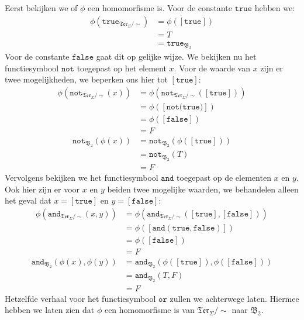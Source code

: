 \documentclass[a4paper,11pt]{article}
\begin{document}
\begin{enumerate}
Eerst bekijken we of $\phi$ een homomorfisme is. Voor de constante
$\texttt{true}$ hebben we:
\begin{align*}
\phi(\texttt{true}_{\mathfrak{Ter}_{\Sigma}/\sim}) &= \phi([\texttt{true}]) \\
                                                   &= T \\
                                                   &= \texttt{true}_{\mathfrak{B}_{2}}
\end{align*}
Voor de constante $\texttt{false}$ gaat dit op gelijke wijze. We bekijken nu
het functiesymbool $\texttt{not}$ toegepast op het element $x$. Voor de waarde
van $x$ zijn er twee mogelijkheden, we beperken ons hier tot
$[\texttt{true}]$:
\begin{align*}
\phi(\texttt{not}_{\mathfrak{Ter}_{\Sigma}/\sim}(x)) &= \phi(\texttt{not}_{\mathfrak{Ter}_{\Sigma}/\sim}([\texttt{true}])) \\
                                                     &= \phi([\texttt{not(true)}]) \\
                                                     &= \phi([\texttt{false}]) \\
                                                     &= F
\end{align*}
\begin{align*}
\texttt{not}_{\mathfrak{B}_{2}}(\phi(x)) &= \texttt{not}_{\mathfrak{B}_{2}}(\phi([\texttt{true}])) \\
                                         &= \texttt{not}_{\mathfrak{B}_{2}}(T) \\
                                         &= F
\end{align*}
Vervolgens bekijken we het functiesymbool $\texttt{and}$ toegepast op de
elementen $x$ en $y$. Ook hier zijn er voor $x$ en $y$ beiden twee mogelijke
waarden, we behandelen alleen het geval dat $x = [\texttt{true}]$ en $y =
[\texttt{false}]$:
\begin{align*}
\phi(\texttt{and}_{\mathfrak{Ter}_{\Sigma}/\sim}(x,y)) &= \phi(\texttt{and}_{\mathfrak{Ter}_{\Sigma}/\sim}([\texttt{true}],[\texttt{false}])) \\
                                                       &= \phi([\texttt{and}(\texttt{true},\texttt{false})]) \\
                                                       &= \phi([\texttt{false}]) \\
                                                       &= F
\end{align*}
\begin{align*}
\texttt{and}_{\mathfrak{B}_{2}}(\phi(x),\phi(y)) &= \texttt{and}_{\mathfrak{B}_{2}}(\phi([\texttt{true}]),\phi([\texttt{false}])) \\
                                                 &= \texttt{and}_{\mathfrak{B}_{2}}(T,F) \\
                                                 &= F
\end{align*}
Hetzelfde verhaal voor het functiesymbool $\texttt{or}$ zullen we achterwege
laten. Hiermee hebben we laten zien dat $\phi$ een homomorfisme is van
$\mathfrak{Ter}_{\Sigma}/\sim$ naar $\mathfrak{B}_{2}$.


\end{enumerate}
\end{document}
